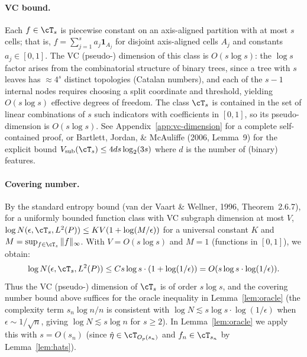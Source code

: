 


\paragraph{VC bound.}
Each $f \in \cT_s$ is piecewise constant on an axis-aligned partition with at most $s$ cells; that is, $f = \sum_{j=1}^s a_j \mathbf{1}_{A_j}$ for disjoint axis-aligned cells $A_j$ and constants $a_j \in [0,1]$. The VC (pseudo-) dimension of this class is $O(s \log s)$: the $\log s$ factor arises from the combinatorial structure of binary trees, since a tree with $s$ leaves has $\approx 4^s$ distinct topologies (Catalan numbers), and each of the $s-1$ internal nodes requires choosing a split coordinate and threshold, yielding $O(s \log s)$ effective degrees of freedom. The class $\cT_s$ is contained in the set of linear combinations of $s$ such indicators with coefficients in $[0,1]$, so its pseudo-dimension is $O(s \log s)$. See Appendix~\ref{app:vc-dimension} for a complete self-contained proof, or Bartlett, Jordan, \& McAuliffe (2006, Lemma~9) for the explicit bound $V_{\text{sub}}(\cT_s) \le 4ds \log_2(3s)$ where $d$ is the number of (binary) features.

\paragraph{Covering number.}
By the standard entropy bound (van der Vaart \& Wellner, 1996, Theorem~2.6.7), for a uniformly bounded function class with VC subgraph dimension at most $V$, $\log N(\epsilon, \cT_s, L^2(P)) \le K V (1 + \log(M/\epsilon))$ for a universal constant $K$ and $M = \sup_{f \in \cT_s} \|f\|_\infty$. With $V = O(s \log s)$ and $M = 1$ (functions in $[0,1]$), we obtain:
\[
\log N(\epsilon, \cT_s, L^2(P)) \le C s \log s \cdot (1 + \log(1/\epsilon)) = O(s \log s \cdot \log(1/\epsilon)).
\]
Thus the VC (pseudo-) dimension of $\cT_s$ is of order $s \log s$, and the covering number bound above suffices for the oracle inequality in Lemma~\ref{lem:oracle} (the complexity term $s_n \log n / n$ is consistent with $\log N \lesssim s \log s \cdot \log(1/\epsilon)$ when $\epsilon \sim 1/\sqrt{n}$, giving $\log N \lesssim s \log n$ for $s \ge 2$). In Lemma~\ref{lem:oracle} we apply this with $s = O(s_n)$ (since $\hat\eta \in \cT_{O_p(s_n)}$ and $f_n \in \cT_{s_n}$ by Lemma~\ref{lem:hats}).


